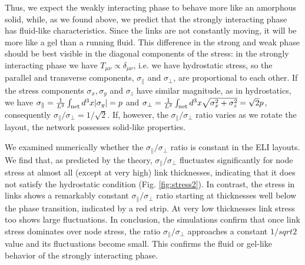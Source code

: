 \documentclass[nofootinbib,preprint,floatfix,titlepage,superscriptaddress]{revtex4} %
\newcommand{\outNim}[1]{}
\begin{document}
\outNim{

In the strongly interacting limit, the links fill up most of the space and nodes are more than $2r_N$ apart from each other, therefore $V_{NN} \sim 0$. 
In the final equilibrium most links are in contact with other links along their entire length. 
Consequently, 
we get 
    $\sum_{<ab>}\int ds_l ds_m \hat{x}_{ab \mu} \hat{x}_{ab\nu} \sim  L\be{l^2} \delta_{\mu\nu}.$ 
where $<ab>$ means adjacent links, $L$ is the number of links and $\be{l^2}$ is the average square link length. 
The other term in $V_{LL}$ is
$\delta_{\mu\nu}\sum_{<ab>}\int ds_l ds_m \approx L \be{l}^2 $
Thus, in the strongly interacting phase the stress tensor is approximately
\begin{align}
    \int dx T_{\mu\nu} & \approx \delta_{\mu\nu} \pr{k + L Ae^{-1} {\sigma_l^2\over 4r_L^2} }
    \label{eq:Tstrong}
\end{align}
with $\sigma_l^2 = \be{l^2} - \be{l}^2$. 

} %
Thus, we expect the weakly interacting phase to behave more like an amorphous solid, while, as we found above, we predict that the strongly interacting phase has fluid-like characteristics. 
Since the links are not constantly moving, it will be more like a gel than a running fluid. 
This difference in the strong and weak phase should be best visible in the diagonal components of the stress: in the strongly interacting phase we have $T_{\mu\nu} \propto \delta_{\mu\nu}$, i.e. we have hydrostatic stress, so the parallel and transverse components, $\sigma_\parallel$ and $\sigma_\perp$, are proportional to each other.  
If the stress components $\sigma_x, \sigma_y$ and $\sigma_z$ have similar magnitude, as in hydrostatics, we have $ \sigma_\parallel ={1\over L^3} \int_\mathrm{net} d^3x |\sigma_y| = p$ and $\sigma_\perp = {1\over L^3} \int_\mathrm{net} d^3x \sqrt{\sigma_x^2+ \sigma_z^2} = \sqrt{2} p$, consequently
 $ \sigma_\parallel/\sigma_\perp = 1/\sqrt{2}$.
If, however, the $ \sigma_\parallel/\sigma_\perp$ ratio varies as we rotate the layout, the network possesses solid-like properties. 

We examined numerically whether the $ \sigma_\parallel/ \sigma_\perp$ ratio is constant in the ELI layouts.
We find that, as predicted by the theory, $\sigma_\parallel/\sigma_\perp$ fluctuates significantly for node stress at almost all (except at very high) link thicknesses, indicating that it does not satisfy the hydrostatic condition (Fig. \ref{fig:stress2}).%
In contrast, the stress in links shows a remarkably constant  $\sigma_\parallel/\sigma_\perp$ ratio starting at thicknesses well below the phase transition, indicated by a red strip. 
At very low thicknesses link stress too shows large fluctuations. 
In conclusion, the simulations confirm that once link stress dominates over node stress, the ratio $\sigma_\parallel/\sigma_\perp$ approaches a constant $1/sqrt{2}$ value and its fluctuations become small. 
This confirms the fluid or gel-like behavior of the strongly interacting phase.  
\end{document}
